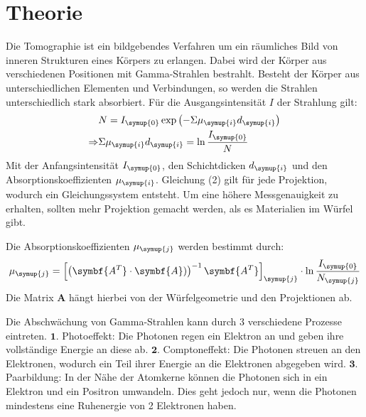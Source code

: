 \section{Theorie}
\label{sec:Theorie}

Die Tomographie ist ein bildgebendes Verfahren um ein räumliches Bild von inneren Strukturen
eines Körpers zu erlangen. Dabei wird der Körper aus verschiedenen Positionen mit
Gamma-Strahlen bestrahlt. Besteht der Körper aus unterschiedlichen Elementen und Verbindungen,
so werden die Strahlen unterschiedlich stark absorbiert. Für die Ausgangsintensität $I$
der Strahlung gilt:
\begin{align}
  &N=I_{\symup{0}} \exp{\left(-\Sigma \mu_{\symup{i}} d_{\symup{i}}\right)} \\
  \Rightarrow &\Sigma \mu_{\symup{i}} d_{\symup{i}} = \ln{\frac{I_{\symup{0}}}{N}}
  \label{eqn:mu}
\end{align}
Mit der Anfangsintensität $I_{\symup{0}}$, den Schichtdicken $d_{\symup{i}}$
und den Absorptionskoeffizienten $\mu_{\symup{i}}$.
Gleichung (2) gilt für jede Projektion, wodurch ein Gleichungssystem entsteht. Um eine höhere
Messgenauigkeit zu erhalten, sollten mehr Projektion gemacht werden, als es
Materialien im Würfel gibt.

Die Absorptionskoeffizienten $\mu_{\symup{j}}$ werden bestimmt durch:
\begin{align}
  \mu_{\symup{j}} = \left[\left(\symbf{A^T} \cdot \symbf{A})\right)^{-1} \symbf{A^T}\right]_{\symup{j}} \cdot \ln{\frac{I_{\symup{0}}}{N_{\symup{j}}}}
\end{align}
Die Matrix $\symbf{A}$ hängt hierbei von der Würfelgeometrie und den Projektionen ab.

Die Abschwächung von Gamma-Strahlen kann durch 3 verschiedene Prozesse eintreten.
$\symbf{1.}$ Photoeffekt: Die Photonen regen ein Elektron an und geben ihre vollständige Energie an diese ab.
$\symbf{2.}$ Comptoneffekt: Die Photonen streuen an den Elektronen, wodurch ein Teil ihrer Energie
an die Elektronen abgegeben wird.
$\symbf{3.}$ Paarbildung: In der Nähe der Atomkerne können die Photonen sich in ein Elektron und ein Positron
umwandeln. Dies geht jedoch nur, wenn die Photonen mindestens eine Ruhenergie von 2 Elektronen
haben.
